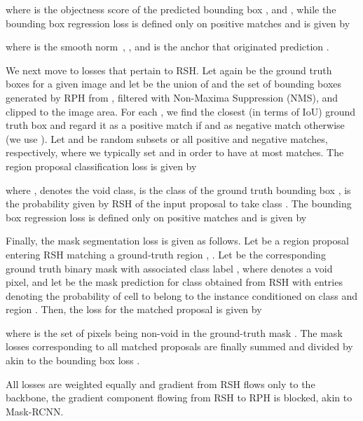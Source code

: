 \documentclass[10pt,twocolumn,letterpaper]{article}
\begin{document}
where  is the objectness score of the predicted bounding box , and , while
the bounding box regression loss is defined only on positive matches  and is given by

where  is the smooth  norm~\cite{Ren+15}, ,  and  is the anchor that originated prediction .

We next move to losses that pertain to RSH.
Let again  be the ground truth boxes for a given image  and let  be the union of  and the set of bounding boxes generated by RPH from , filtered with Non-Maxima Suppression (NMS), and clipped to the image area. For each , we find the closest (in terms of IoU) ground truth box  and regard it as a positive match if  and as negative match otherwise (we use ). Let  and  be random subsets or all positive and negative matches, respectively, where we typically set  and  in order to have at most  matches.
The region proposal classification loss is given by

where ,  denotes the void class,  is the class of the ground truth bounding box ,  is the probability given by RSH of the input proposal  to take class .
The bounding box regression loss is defined only on positive matches  and is given by


Finally, the mask segmentation loss is given as follows.
Let  be a region proposal entering RSH matching a ground-truth region , \ie . Let  be the corresponding ground truth binary mask with associated class label , where  denotes a void pixel, and let  be the mask prediction for class  obtained from RSH with entries  denoting the probability of cell  to belong to the instance conditioned on class  and region . Then, the loss for the matched proposal  is given by

where  is the set of pixels being non-void in the ground-truth  mask .
The mask losses corresponding to all matched proposals are finally summed and divided by  akin to the bounding box loss .

All losses are weighted equally and gradient from RSH flows only to the backbone, \ie the gradient component flowing from RSH to RPH is blocked, akin to Mask-RCNN.
\end{document}
